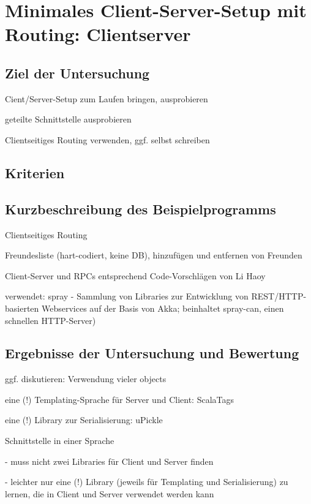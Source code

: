 \documentclass[a4paper, 12pt, hidelinks, listof=totoc, listoftables=totoc, bibliography=totoc]{scrreprt}
\begin{document}
\section{Minimales Client-Server-Setup mit Routing: Clientserver}


\subsection{Ziel der Untersuchung}

Cient/Server-Setup zum Laufen bringen, ausprobieren

geteilte Schnittstelle ausprobieren

Clientseitiges Routing verwenden, ggf. selbst schreiben

\subsection{Kriterien}
\subsection{Kurzbeschreibung des Beispielprogramms}

Clientseitiges Routing

Freundesliste (hart-codiert, keine DB), hinzufügen und entfernen von Freunden

Client-Server und RPCs entsprechend Code-Vorschlägen von Li Haoy\cite[]{haoyi.HOS}

verwendet: spray - Sammlung von Libraries zur Entwicklung von REST/HTTP-basierten Webservices auf der Basis von Akka; beinhaltet spray-can, einen schnellen HTTP-Server)

\subsection{Ergebnisse der Untersuchung und Bewertung}


ggf. diskutieren: Verwendung vieler objects

eine (!) Templating-Sprache für Server und Client: ScalaTags \cite{haoyi.HOS}

eine (!) Library zur Serialisierung: uPickle \cite{haoyi.HOS}

Schnittstelle in einer Sprache

- muss nicht zwei Libraries für Client und Server finden

- leichter nur eine (!) Library (jeweils für Templating und Serialisierung) zu lernen, die in Client und Server verwendet werden kann
\cite[\#SharingCode]{haoyi.HOS}
\end{document}
